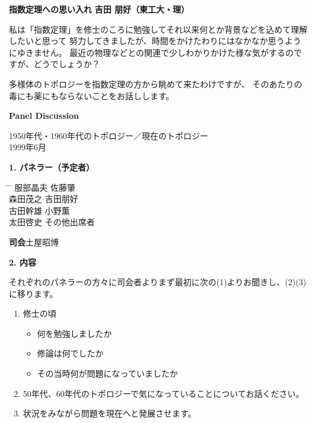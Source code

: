 \documentclass[uplatex,dvipdfmx]{jlreq}
\begin{document}
\newpage

\noindent
{\large\bfseries 指数定理への思い入れ}
\hfill
{\large\bfseries 吉田 朋好（東工大・理）}

\medskip

私は「指数定理」を修士のころに勉強してそれ以来何とか背景などを込めて理解したいと思って
努力してきましたが、時間をかけたわりにはなかなか思うようにゆきません。
最近の物理などとの関連で少しわかりかけた様な気がするのですが、どうでしょうか？

多様体のトポロジーを指数定理の方から眺めて来たわけですが、
そのあたりの毒にも薬にもならないことをお話しします。

\newpage

\begin{center}
  {\large\bfseries Panel Discussion}
\end{center}
\begin{center}
  1950年代・1960年代のトポロジー／現在のトポロジー\\
  1999年6月
\end{center}

\medskip
\noindent\textbf{1. パネラー（予定者）}

\medskip
\begin{tabbing}
  \hspace{2cm} \= \hspace{4cm} \= \hspace{4cm} \kill
  \> 服部晶夫 \> 佐藤肇 \\
  \> 森田茂之 \> 吉田朋好 \\
  \> 古田幹雄 \> 小野薫 \\
  \> 太田啓史 \> その他出席者
\end{tabbing}

\medskip
\noindent\textbf{司会}\quad 土屋昭博

\bigskip
\noindent\textbf{2. 内容}

\medskip
それぞれのパネラーの方々に司会者よりまず最初に次の(1)よりお聞きし、(2)(3)に移ります。

\begin{enumerate}
  \item 修士の頃
        \begin{itemize}
          \item 何を勉強しましたか
          \item 修論は何でしたか
          \item その当時何が問題になっていましたか
        \end{itemize}
  \item 50年代、60年代のトポロジーで気になっていることについてお話ください。
  \item 状況をみながら問題を現在へと発展させます。
\end{enumerate}
\end{document}
